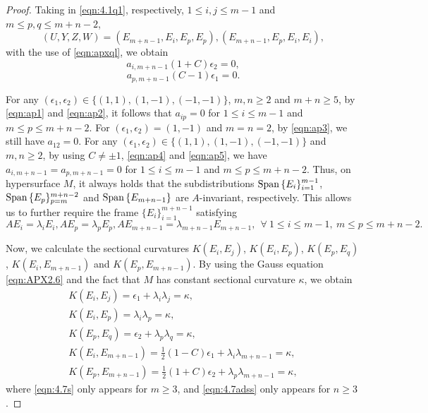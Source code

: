 \documentclass[reqno]{amsart}%
\theoremstyle{definition}
\numberwithin{equation}{section}
\begin{document}
\begin{proof}
Taking in \eqref{eqn:4.1q1}, respectively, $1\leq i, j\leq m-1$ and $m\leq p,q\leq m+n-2$,
%
$$
(U,Y,Z,W)=(E_{m+n-1},E_i,E_p,E_p),(E_{m+n-1},E_p,E_i,E_i),
$$
with the use of \eqref{eqn:apxql}, we obtain  
\begin{equation}\label{eqn:ap4}
	a_{i,m+n-1}(1+C)\epsilon_2=0,
\end{equation}
\begin{equation}\label{eqn:ap5}
	a_{p,m+n-1}(C-1)\epsilon_1=0.
\end{equation}


For any $(\epsilon_1,\epsilon_2)\in \{(1,1),(1,-1),(-1,-1)\}$, $m,n\geq2$ and $m+n\geq5$, by 
\eqref{eqn:ap1} and \eqref{eqn:ap2}, it follows that $a_{ip}=0$ for $1\leq i\leq m-1$ and $m\leq p\leq m+n-2$. 
For $(\epsilon_1,\epsilon_2)=(1,-1)$ and $m=n=2$, by \eqref{eqn:ap3}, we still have $a_{12}=0$. 
For any $(\epsilon_1,\epsilon_2)\in \{(1,1),(1,-1),(-1,-1)\}$ and $m,n\geq2$, by using $C\neq\pm1$,  \eqref{eqn:ap4} and \eqref{eqn:ap5}, we have $a_{i,m+n-1}=a_{p,m+n-1}=0$ for $1\leq i\leq m-1$ and $m\leq p\leq m+n-2$. Thus, on hypersurface $M$, it always holds that the subdistributions 
${\rm Span}\,\{E_i\}_{i=1}^{m-1}$, ${\rm Span}\,\{E_p\}_{p=m}^{m+n-2}$ and ${\rm Span}\,\{E_{m+n-1}\}$ 
are $A$-invariant, respectively. This allows us to further require the frame $\{E_i\}_{i=1}^{m+n-1}$ satisfying 
$$
AE_i=\lambda_iE_i,  AE_p=\lambda_pE_p, AE_{m+n-1}=\lambda_{m+n-1}E_{m+n-1}, 
\ \ \forall \ 1\leq i\leq m-1,\ m\leq p\leq m+n-2.
$$

Now, we calculate the sectional curvatures $K(E_i,E_j)$, $K(E_i,E_p)$, $K(E_p,E_q)$, $K(E_i,E_{m+n-1})$ and 
$K(E_p,E_{m+n-1})$. By using the Gauss equation \eqref{eqn:APX2.6} and the fact that $M$ has constant sectional curvature $\kappa$, 
we obtain 
%
\begin{gather}
	K(E_i,E_j)=\epsilon_1+\lambda_i\lambda_j=\kappa,\label{eqn:4.7s}\\
	K(E_i,E_p)=\lambda_i\lambda_{p}=\kappa,\label{eqn:4.8s}\\
	K(E_p,E_q)=\epsilon_2+\lambda_p\lambda_q=\kappa,\label{eqn:4.7adss}\\
	K(E_i,E_{m+n-1})=\tfrac{1}{2}(1-C)\epsilon_1+\lambda_i\lambda_{m+n-1}=\kappa,\label{eqn:4.9s}\\
	K(E_p,E_{m+n-1})=\tfrac{1}{2}(1+C)\epsilon_2+\lambda_p\lambda_{m+n-1}=\kappa,\label{eqn:4.9as}
\end{gather}
where \eqref{eqn:4.7s} only appears for $m\geq3$, and 
\eqref{eqn:4.7adss} only appears for $n\geq3$.



\end{proof}
\end{document}
